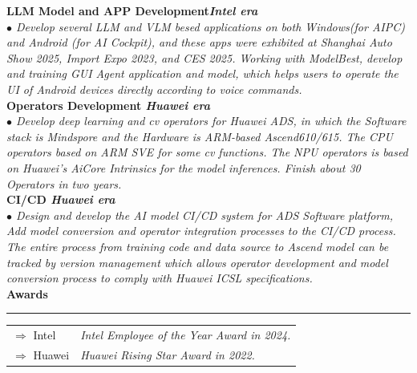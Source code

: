\documentclass[a4paper,12pt,final]{memoir}
\newcommand{\myThemeColor}{RoyalBlue}
\newcommand{\SmallSep}{\vspace{0.9em}}
\newcommand{\CVSection}[1]
	{\Large\textbf{#1}\par
	\vspace{0.2cm}\normalsize\normalfont}
\newcommand{\CVItem}[1]
	{\textbf{\color{\myThemeColor} #1}}
\begin{document}
\begin{CJK*}{UTF8}{gbsn}
\CVItem{LLM Model and APP Development\hfill\emph{Intel era}}\\
\textit{$\bullet$ 
Develop several LLM and VLM besed applications on both Windows(for AIPC) and Android (for AI Cockpit), and these apps were exhibited at Shanghai Auto Show 2025, Import Expo 2023, and CES 2025.  Working with ModelBest, develop and training GUI Agent application and model, which helps users to operate the UI of Android devices directly according to voice commands.} 
\\
\CVItem{Operators Development \hfill\emph{Huawei era}}\\
\textit{$\bullet$ Develop deep learning and cv operators for Huawei ADS, in which the Software stack is Mindspore and the Hardware is ARM-based Ascend610/615. The CPU operators based on ARM SVE for some cv functions. The NPU operators is based on Huawei’s AiCore Intrinsics for the model inferences. Finish about 30 Operators in two years.}
\\
\CVItem{CI/CD \hfill\emph{Huawei era}}\\
\textit{$\bullet$ 
Design and develop the AI model CI/CD system for ADS Software platform, Add model conversion and operator integration processes to the CI/CD process. The entire process from training code and data source to Ascend model can be tracked by version management which allows operator development and model conversion process to comply with Huawei ICSL specifications. }
\\

\CVSection{Awards}
\hrule
\SmallSep
	\begin{tabular}{l|l}
		$\Rightarrow$ Intel &\textit{ Intel Employee of the Year Award in 2024.}\footnotesize\\
		$\Rightarrow$ Huawei&\textit{ Huawei Rising Star Award in 2022.}\\
	\end{tabular}

\end{CJK*}
\end{document}
